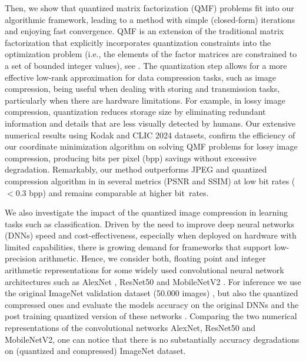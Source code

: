 \documentclass[lettersize,journal]{IEEEtran}
\begin{document}
\medskip 

\noindent Then, we show that quantized matrix factorization (QMF) problems fit into our algorithmic framework, leading to a method with simple (closed-form) iterations and enjoying fast convergence.  QMF is an extension of the traditional  matrix factorization \cite{gillis2020nonnegative}  that explicitly incorporates quantization constraints  into the optimization problem (i.e., the  elements of the factor matrices are constrained to a set of bounded integer values), see \cite{Fre:14,fedotov2025qmf, qmf}.   The quantization step allows for a more effective low-rank approximation for data compression tasks, such as image compression, being useful when dealing with storing and transmission tasks, particularly when there are hardware limitations. For example, in lossy image compression, quantization  reduces storage size by eliminating redundant information and details that are less visually detected by humans. Our extensive numerical results using  Kodak \cite{kodak1993} and  CLIC 2024 \cite{clic2024}  datasets, confirm the   efficiency of our coordinate minimization  algorithm on solving QMF problems  for lossy image compression, producing bits per pixel (bpp) savings without excessive degradation. Remarkably, our method outperforms JPEG and quantized compression algorithm in \cite{qmf} in several metrics (PSNR and SSIM) at low bit rates ($<0.3$ bpp)  and remains comparable at higher bit~rates.

\medskip 

\noindent We also investigate the impact of the  quantized image compression in  learning tasks such as classification. Driven by the need to improve deep neural networks (DNNs) speed and cost-effectiveness, especially when deployed on hardware with limited capabilities, there is growing demand for frameworks that support low-precision arithmetic. Hence, we consider both, floating point and integer arithmetic representations for some widely used convolutional neural network architectures such as AlexNet \cite{alexnet}, ResNet50 \cite{resnet} and MobileNetV2 \cite{mobilenetv2}. For inference we use the original ImageNet  validation  dataset (50.000 images) \cite{deng2009imagenet},  but also the quantized compressed ones and evaluate the models accuracy on  the original DNNs and the  post training quantized version of these networks \cite{gholami2022survey, wang2022niti}.  Comparing the two numerical representations of the convolutional networks AlexNet, ResNet50  and MobileNetV2, one can notice that there is no substantially accuracy degradations on (quantized and compressed) ImageNet dataset.
\end{document}
